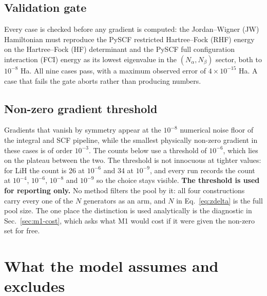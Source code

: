 \documentclass[10pt]{article}
\begin{document}
\subsection{Validation gate}

Every case is checked before any gradient is computed: the Jordan--Wigner (JW) Hamiltonian must reproduce the PySCF restricted Hartree--Fock (RHF) energy on the Hartree--Fock (HF) determinant and the PySCF full configuration interaction (FCI) energy as its lowest eigenvalue in the $(N_\alpha,N_\beta)$ sector, both to $10^{-8}$ Ha. All nine cases pass, with a maximum observed error of $4\times10^{-15}$ Ha. A case that fails the gate aborts rather than producing numbers.

\subsection{Non-zero gradient threshold}

Gradients that vanish by symmetry appear at the $10^{-8}$ numerical noise floor of the integral and SCF pipeline, while the smallest physically non-zero gradient in these cases is of order $10^{-3}$. The counts below use a threshold of $10^{-6}$, which lies on the plateau between the two. The threshold is not innocuous at tighter values: for LiH the count is 26 at $10^{-6}$ and 34 at $10^{-9}$, and every run records the count at $10^{-4}$, $10^{-6}$, $10^{-8}$ and $10^{-9}$ so the choice stays visible. \textbf{The threshold is used for reporting only.} No method filters the pool by it: all four constructions carry every one of the $N$ generators as an arm, and $N$ in Eq.~\eqref{eq:zdelta} is the full pool size. The one place the distinction is used analytically is the diagnostic in Sec.~\ref{sec:m1-cost}, which asks what M1 would cost if it were given the non-zero set for free.

\section{What the model assumes and excludes}
\label{sec:assumptions}
\end{document}
